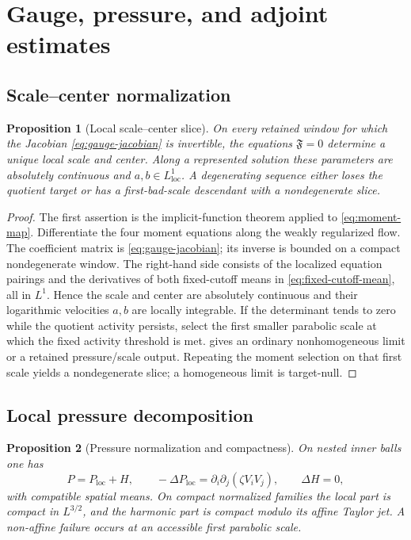 \documentclass[11pt]{amsart}
\numberwithin{equation}{section}
\theoremstyle{plain}
\newtheorem{proposition}[proposition]{Proposition}
\theoremstyle{definition}
\theoremstyle{remark}
\begin{document}
\section{Gauge, pressure, and adjoint estimates}
\label{app:gauge-pressure}

\subsection{Scale--center normalization}
\label{app:scale-center-normalization}

\begin{proposition}[Local scale--center slice]
\label{prop:local-scale-center-slice}
On every retained window for which the Jacobian
\eqref{eq:gauge-jacobian} is invertible, the equations
\(\mathfrak F=0\) determine a unique local scale and center.  Along a
represented solution these parameters are absolutely continuous and
\(a,b\in L^1_{\mathrm{loc}}\).  A degenerating sequence either loses the
quotient target or has a first-bad-scale descendant with a nondegenerate
slice.
\end{proposition}

\begin{proof}
The first assertion is the implicit-function theorem applied to
\eqref{eq:moment-map}.  Differentiate the four moment equations along the
weakly regularized flow.  The coefficient matrix is
\eqref{eq:gauge-jacobian}; its inverse is bounded on a compact
nondegenerate window.  The right-hand side consists of the localized equation
pairings and the derivatives of both fixed-cutoff means in
\eqref{eq:fixed-cutoff-mean}, all in \(L^1\).  Hence the scale and center are
absolutely continuous and their logarithmic velocities \(a,b\) are locally
integrable.  If the determinant tends to zero while the quotient activity
persists, select the first smaller parabolic scale at which the fixed
activity threshold is met.   gives an
ordinary nonhomogeneous limit or a retained pressure/scale output.  Repeating
the moment selection on that first scale yields a nondegenerate slice; a
homogeneous limit is target-null.
\end{proof}

\subsection{Local pressure decomposition}
\label{app:local-pressure-decomposition}

\begin{proposition}[Pressure normalization and compactness]
\label{prop:pressure-normalization-compactness}
On nested inner balls one has
\[
 P=P_{\mathrm{loc}}+H,
 \qquad
 -\Delta P_{\mathrm{loc}}
 =\partial_i\partial_j(\zeta V_iV_j),
 \qquad \Delta H=0,
\]
with compatible spatial means.  On compact normalized families the local
part is compact in \(L^{3/2}\), and the harmonic part is compact modulo its
affine Taylor jet.  A non-affine failure occurs at an accessible first
parabolic scale.
\end{proposition}
\end{document}
